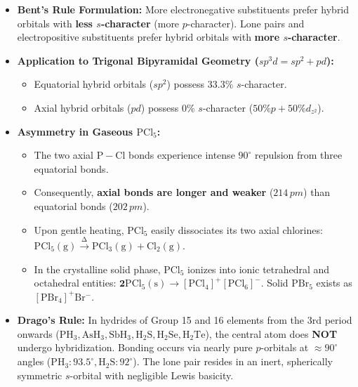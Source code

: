 \documentclass[10pt,a4paper]{article}
\begin{document}
\begin{conceptbox}
\begin{itemize}
  \item \textbf{Bent's Rule Formulation:} More electronegative substituents prefer hybrid orbitals with \textbf{less $s$-character} (more $p$-character). Lone pairs and electropositive substituents prefer hybrid orbitals with \textbf{more $s$-character}.
  \item \textbf{Application to Trigonal Bipyramidal Geometry ($sp^3d = sp^2 + pd$):}
  \begin{itemize}
    \item Equatorial hybrid orbitals ($sp^2$) possess $33.3\%$ $s$-character.
    \item Axial hybrid orbitals ($pd$) possess $0\%$ $s$-character ($50\% p + 50\% d_{z^2}$).
  \end{itemize}
  \item \textbf{Asymmetry in Gaseous $\mathrm{PCl_5}$:}
  \begin{itemize}
    \item The two axial $\mathrm{P-Cl}$ bonds experience intense $90^\circ$ repulsion from three equatorial bonds.
    \item Consequently, \textbf{axial bonds are longer and weaker} ($214\,\si{pm}$) than equatorial bonds ($202\,\si{pm}$).
    \item Upon gentle heating, $\mathrm{PCl_5}$ easily dissociates its two axial chlorines: $\mathrm{PCl_5(g) \xrightarrow{\Delta} PCl_3(g) + Cl_2(g)}$.
    \item In the crystalline solid phase, $\mathrm{PCl_5}$ ionizes into ionic tetrahedral and octahedral entities: $\mathbf{2\mathrm{PCl_5(s)} \longrightarrow [\mathrm{PCl_4}]^+[\mathrm{PCl_6}]^-}$. Solid $\mathrm{PBr_5}$ exists as $[\mathrm{PBr_4}]^+\mathrm{Br^-}$.
  \end{itemize}
  \item \textbf{Drago's Rule:}
  In hydrides of Group 15 and 16 elements from the 3rd period onwards ($\mathrm{PH_3, AsH_3, SbH_3, H_2S, H_2Se, H_2Te}$), the central atom does \textbf{NOT} undergo hybridization. Bonding occurs via nearly pure $p$-orbitals at $\approx 90^\circ$ angles ($\mathrm{PH_3}: 93.5^\circ, \mathrm{H_2S}: 92^\circ$). The lone pair resides in an inert, spherically symmetric $s$-orbital with negligible Lewis basicity.
\end{itemize}
\end{conceptbox}
\end{document}
